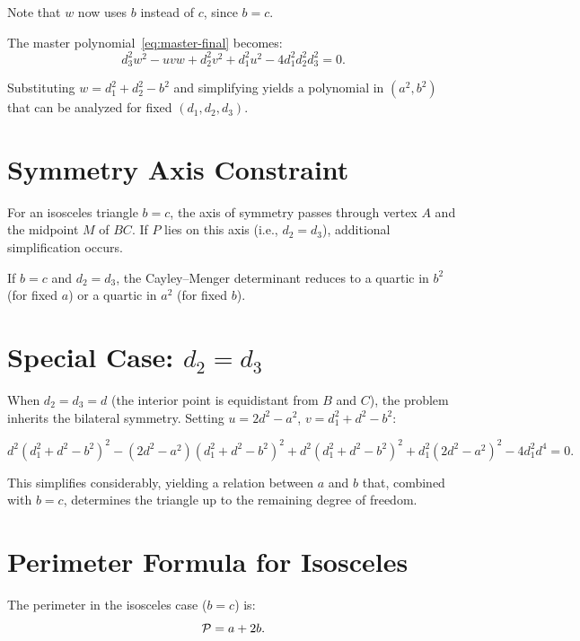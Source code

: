 Note that $w$ now uses $b$ instead of $c$, since $b = c$.

The master polynomial~\eqref{eq:master-final} becomes:
\begin{equation}
d_3^2 w^2 - uvw + d_2^2 v^2 + d_1^2 u^2 - 4d_1^2 d_2^2 d_3^2 = 0.
\end{equation}

Substituting $w = d_1^2 + d_2^2 - b^2$ and simplifying yields a polynomial in $(a^2, b^2)$ that can be analyzed for fixed $(d_1, d_2, d_3)$.

\section{Symmetry Axis Constraint}

For an isosceles triangle $b = c$, the axis of symmetry passes through vertex $A$ and the midpoint $M$ of $BC$. If $P$ lies on this axis (i.e., $d_2 = d_3$), additional simplification occurs.

\begin{theorem}
If $b = c$ and $d_2 = d_3$, the Cayley--Menger determinant reduces to a quartic in $b^2$ (for fixed $a$) or a quartic in $a^2$ (for fixed $b$).
\end{theorem}

\section{Special Case: $d_2 = d_3$}

When $d_2 = d_3 = d$ (the interior point is equidistant from $B$ and $C$), the problem inherits the bilateral symmetry. Setting $u = 2d^2 - a^2$, $v = d_1^2 + d^2 - b^2$:

\begin{equation}
d^2(d_1^2 + d^2 - b^2)^2 - (2d^2 - a^2)(d_1^2 + d^2 - b^2)^2 + d^2(d_1^2 + d^2 - b^2)^2 + d_1^2(2d^2 - a^2)^2 - 4d_1^2 d^4 = 0.
\end{equation}

This simplifies considerably, yielding a relation between $a$ and $b$ that, combined with $b = c$, determines the triangle up to the remaining degree of freedom.

\section{Perimeter Formula for Isosceles}

The perimeter in the isosceles case ($b = c$) is:
\begin{equation}
\mathcal{P} = a + 2b.
\end{equation}

